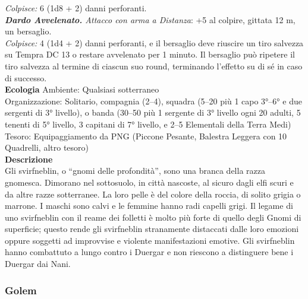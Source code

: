 \begin{multicols}{2}
\emph{Colpisce:} 6 (1d8 + 2) danni perforanti.\\
\emph{\textbf{Dardo Avvelenato.} Attacco con arma a Distanza}: +5 al colpire, gittata 12 m, un bersaglio.\\
\emph{Colpisce:} 4 (1d4 + 2) danni perforanti, e il bersaglio deve riuscire un tiro salvezza su Tempra DC  13 o restare avvelenato per 1 minuto. Il bersaglio può ripetere il tiro salvezza al termine di ciascun suo round, terminando l'effetto su di sé in caso di successo.\\
\textbf{Ecologia}
Ambiente: Qualsiasi sotterraneo\\
Organizzazione: Solitario, compagnia (2–4), squadra (5–20 più 1 capo 3°–6° e due sergenti di 3° livello), o banda (30–50 più 1 sergente di 3° livello ogni 20 adulti, 5 tenenti di 5° livello, 3 capitani di 7° livello, e 2–5 Elementali della Terra Medi)\\
Tesoro: Equipaggiamento da PNG (Piccone Pesante, Balestra Leggera con 10 Quadrelli, altro tesoro)\\
\textbf{Descrizione}\\
Gli svirfneblin, o “gnomi delle profondità”, sono una branca della razza gnomesca. Dimorano nel sottosuolo, in città nascoste, al sicuro dagli elfi scuri e da altre razze sotterranee. La loro pelle è del colore della roccia, di solito grigia o marrone. I maschi sono calvi e le femmine hanno radi capelli grigi. Il legame di uno svirfneblin con il reame dei folletti è molto più forte di quello degli Gnomi di superficie; questo rende gli svirfneblin stranamente distaccati dalle loro emozioni oppure soggetti ad improvvise e violente manifestazioni emotive. Gli svirfneblin hanno combattuto a lungo contro i Duergar e non riescono a distinguere bene i Duergar dai Nani.\\

\subsubsection{Golem}


\end{multicols}
